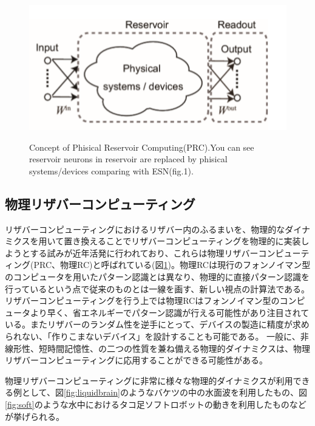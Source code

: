 \documentclass[a4j, twocolumn]{jsarticle}
\begin{document}
\begin{figure}
\centering
\includegraphics[width=1\hsize]{./figures/phisicalrc2}\\
\caption{Concept of Phisical Reservoir Computing(PRC)\cite{tanaka2018recent}.You can see reservoir neurons in reservoir are replaced by phisical systems/devices comparing with ESN(fig.1).}
\label{fig:prc}
\end{figure}

\subsection{物理リザバーコンピューティング}
リザバーコンピューティングにおけるリザバー内のふるまいを、物理的なダイナミクスを用いて置き換えることでリザバーコンピューティングを物理的に実装しようとする試みが近年活発に行われており、これらは物理リザバーコンピューティング(PRC、物理RC)と呼ばれている(図\ref{fig:prc})。物理RCは現行のフォンノイマン型のコンピュータを用いたパターン認識とは異なり、物理的に直接パターン認識を行っているという点で従来のものとは一線を画す、新しい視点の計算法である。リザバーコンピューティングを行う上では物理RCはフォンノイマン型のコンピュータより早く、省エネルギーでパターン認識が行える可能性があり注目されている。またリザバーのランダム性を逆手にとって、デバイスの製造に精度が求められない、「作りこまないデバイス」を設計することも可能である\cite{ahirose2019J_IEICE:_prosp_for_reser_compu}。
一般に、非線形性、短時間記憶性、の二つの性質を兼ね備える物理的ダイナミクスは、物理リザバーコンピューティングに応用することができる可能性がある。


物理リザバーコンピューティングに非常に様々な物理的ダイナミクスが利用できる例として、図\ref{fig:liquidbrain}のようなバケツの中の水面波を利用したもの\cite{Fernando2003AL:_patter_recog_in_a_bucke}、図\ref{fig:soft}のような水中におけるタコ足ソフトロボットの動きを利用したもの\cite{Nakajima2015SciReo:_infor_proce_via_physi_soft_body}などが挙げられる。
\end{document}
